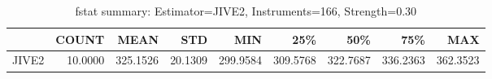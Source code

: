 \begin{table}[ht]
\centering
\caption{fstat summary: Estimator=JIVE2, Instruments=166, Strength=0.30}
\begin{tabular}{lrrrrrrrr}
\toprule
 & COUNT & MEAN & STD & MIN & 25\% & 50\% & 75\% & MAX \\
\midrule
JIVE2 & 10.0000 & 325.1526 & 20.1309 & 299.9584 & 309.5768 & 322.7687 & 336.2363 & 362.3523 \\
\bottomrule
\end{tabular}
\end{table}
